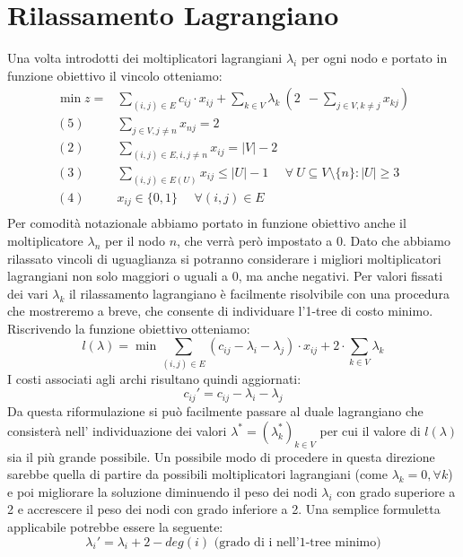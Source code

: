 \documentclass[
	article,			%
	12pt,				%
	oneside,			%
	a4paper,			%
	english,			%
	italian,				%
	sumario=tradicional,
	]{abntex2}
\begin{document}
\section{Rilassamento Lagrangiano}
Una volta introdotti dei moltiplicatori lagrangiani $\lambda_i$ per ogni nodo e portato in funzione obiettivo il vincolo otteniamo:
\begin{equation*}
    \begin{split}
         \min z = & \sum_{(i,j) \in E} c_{ij} \cdot x_{ij} + \sum_{k\in V} \lambda_k \:(2 \:\:- \sum_{j\in V, k\neq j} x_{kj})\\
        (5)\:\:\:\:\:\: & \sum_{j \in V, j \neq n} x_{nj} = 2 \\
        (2) \:\:\:\:\:\: & \sum_{(i,j)\in E, i, j \neq n} x_{ij} = |V|-2 \\
        (3) \:\:\:\:\:\: & \sum_{(i,j) \in E(U)} x_{ij} \leq |U| - 1 \:\:\:\:\:\: \forall\: U \subseteq V\setminus\{n\} : |U| \geq 3 \\
        (4) \:\:\:\:\:\: & x_{ij} \in \{0,1\} \:\:\:\:\:\: \forall (i,j) \in E\\
    \end{split}
\end{equation*}
Per comodità notazionale abbiamo portato in funzione obiettivo anche il moltiplicatore $\lambda_n$ per il nodo $n$, che verrà però impostato a 0. Dato che abbiamo rilassato vincoli di uguaglianza si potranno considerare i migliori moltiplicatori lagrangiani non solo maggiori o uguali a 0, ma anche negativi. Per valori fissati dei vari $\lambda_k$ il rilassamento lagrangiano è facilmente risolvibile con una procedura che mostreremo a breve, che consente di individuare l'1-tree di costo minimo.
\newline
Riscrivendo la funzione obiettivo otteniamo:
\begin{equation*}
    l(\lambda) = \min \sum_{(i,j)\in E} ( c_{ij} - \lambda_i - \lambda_j) \cdot x_{ij} + 2 \cdot \sum_{k \in V} \lambda_k
\end{equation*}
I costi associati agli archi risultano quindi aggiornati:
\begin{equation*}
    c_{ij}' = c_{ij} - \lambda_i - \lambda_j
\end{equation*}
Da questa riformulazione si può facilmente passare al duale lagrangiano che consisterà nell' individuazione dei valori $\lambda^* = (\lambda_k^*)_{k\in V}$ per cui il valore di $l(\lambda)$ sia il più grande possibile. Un possibile modo di procedere in questa direzione sarebbe quella di partire da possibili moltiplicatori lagrangiani (come $\lambda_k = 0, \forall k$) e poi migliorare la soluzione diminuendo il peso dei nodi $\lambda_i$ con grado superiore a 2 e accrescere il peso dei nodi con grado inferiore a 2. Una semplice formuletta applicabile potrebbe essere la seguente:
\begin{equation*}
    \lambda_i' = \lambda_i + 2 - deg(i) \text{ (grado di i nell'1-tree minimo)}
\end{equation*}
\end{document}
